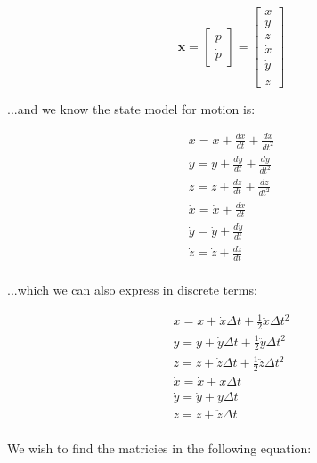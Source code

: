 \documentclass{article}
\begin{document}
\begin{equation}
    \textbf{x} = \begin{bmatrix}
        p \\ \dot{p}
    \end{bmatrix} =
    \begin{bmatrix}
        x       \\ y \\ z \\
        \dot{x} \\ \dot{y} \\ \dot{z}
    \end{bmatrix}
\end{equation}

...and we know the state model for motion is:

\begin{equation}
    \begin{split}
        x = x + \frac{dx}{dt} + \frac{dx}{dt^2} \\
        y = y + \frac{dy}{dt} + \frac{dy}{dt^2} \\
        z = z + \frac{dz}{dt} + \frac{dz}{dt^2} \\
        \dot{x} = \dot{x} + \frac{d\dot{x}}{dt} \\
        \dot{y} = \dot{y} + \frac{d\dot{y}}{dt} \\
        \dot{z} = \dot{z} + \frac{d\dot{z}}{dt} \\
    \end{split}
\end{equation}

...which we can also express in discrete terms:

\begin{equation}
    \begin{split}
        x = x + \dot{x} \Delta t + \frac{1}{2} \ddot{x} \Delta t^2 \\
        y = y + \dot{y} \Delta t + \frac{1}{2} \ddot{y} \Delta t^2 \\
        z = z + \dot{z} \Delta t + \frac{1}{2} \ddot{z} \Delta t^2 \\
        \dot{x} = \dot{x} + \ddot{x} \Delta t \\
        \dot{y} = \dot{y} + \ddot{y} \Delta t \\
        \dot{z} = \dot{z} + \ddot{z} \Delta t \\
    \end{split}
\end{equation}

We wish to find the matricies in the following equation:
\end{document}
